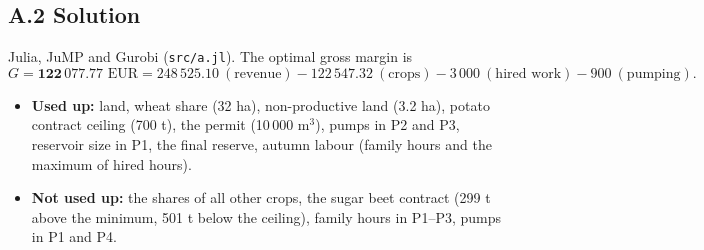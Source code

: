 \subsection*{A.2 \quad Solution}

Julia, JuMP and Gurobi (\texttt{src/a.jl}). The optimal gross margin is
\[
G=\mathbf{122\,077.77}\text{ EUR}=248\,525.10\ (\text{revenue})-122\,547.32\ (\text{crops})-3\,000\ (\text{hired work})-900\ (\text{pumping}).
\]





\begin{itemize}
\item \textbf{Used up:} land, wheat share (32 ha), non-productive land (3.2 ha), potato contract ceiling (700 t), the permit (10\,000 m$^3$), pumps in P2 and P3, reservoir size in P1, the final reserve, autumn labour (family hours and the maximum of hired hours).
\item \textbf{Not used up:} the shares of all other crops, the sugar beet contract (299 t above the minimum, 501 t below the ceiling), family hours in P1--P3, pumps in P1 and P4.
\end{itemize}
